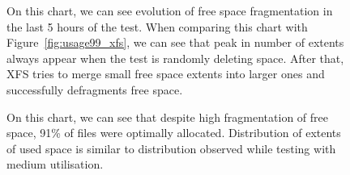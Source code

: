\documentclass[
  color, %
  table, %
  lof,   %
  lot,   %
]{fithesis3}
\begin{document}
\begin{figure}[h]
    \centering
    \caption[Evolution of free space fragmentation of XFS during testing of high utilisation of HDD]{On this chart, we can see evolution of free space fragmentation in the last 5 hours of the test. When comparing this chart with Figure~\ref{fig:usage99_xfs}, we can see that peak in number of extents always appear when the test is randomly deleting space. After that, XFS tries to merge small free space extents into larger ones and successfully defragments free space.}
    \label{fig:free99_xfs}
\end{figure}

\begin{figure}[h]
    \centering
    \caption[Size distribution of file extents of XFS during testing high utilisation of HDD]{On this chart, we can see that despite high fragmentation of free space, 91\% of files were optimally allocated. Distribution of extents of used space is similar to distribution observed while testing with medium utilisation.}
    \label{fig:used99_xfs}
\end{figure}
\end{document}
